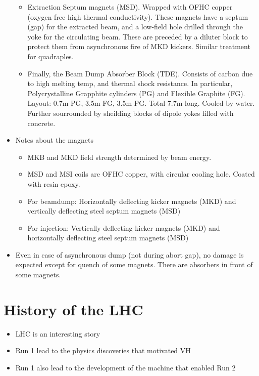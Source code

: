 \begin{itemize}
\begin{itemize}
        \item Extraction Septum magnets (MSD). Wrapped with OFHC copper (oxygen free high thermal conductivity). These magnets have a septum (gap) for the extracted beam, and a low-field hole drilled through the yoke for the circulating beam. These are preceded by a diluter block to protect them from asynchronous fire of MKD kickers. Similar treatment for quadraples. \cite{lhcDesignV1}
        \item Finally, the Beam Dump Absorber Block (TDE). Consists of carbon due to high melting temp, and thermal shock resistance. In particular, Polycrystalline Grapphite cylinders (PG) and Flexible Graphite (FG). Layout: 0.7m PG, 3.5m FG, 3.5m PG. Total 7.7m long. Cooled by water. Further sourrounded by sheilding blocks of dipole yokes filled with concrete. \cite{lhcDesignV1}
    \end{itemize}
    \item Notes about the magnets
    \begin{itemize}\scriptsize
        \item MKB and MKD field strength determined by beam energy. \cite{lhcDesignV1}
        \item MSD and MSI coils are OFHC copper, with circular cooling hole. Coated with resin epoxy. \cite{bidon}
        \item For beamdump: Horizontally deflecting kicker magnets (MKD) and vertically deflecting steel septum magnets (MSD) \cite{bidon}
        \item For injection: Vertically deflecting kicker magnets (MKD) and horizontally deflecting steel septum magnets (MSD) \cite{bidon}
    \end{itemize}
    \item Even in case of asynchronous dump (not during abort gap), no damage is expected except for quench of some magnets. There are absorbers in front of some magnets. \cite{lhcDesignV1}
\end{itemize}

\section{History of the LHC}
\begin{itemize}
    \item LHC is an interesting story
    \item Run 1 lead to the physics discoveries that motivated VH
    \item Run 1 also lead to the development of the machine that enabled Run 2
\end{itemize}
